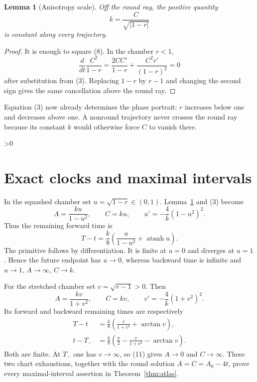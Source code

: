 \documentclass[10pt]{article}
\providecommand{\CRevisionRound}{2}
\newtheorem{lemma}{Lemma}
\theoremstyle{remark}
\begin{document}
\begin{lemma}[Anisotropy scale]\label{lem:first}
Off the round ray, the positive quantity
\begin{equation}
                 k=\frac{C}{\sqrt{|1-r|}}           \label{eq:first}
\end{equation}
is constant along every trajectory.
\end{lemma}

\begin{proof}
It is enough to square (8).  In the chamber $r<1$,
\[
 \frac{d}{dt}\frac{C^2}{1-r}
 =\frac{2CC'}{1-r}+\frac{C^2r'}{(1-r)^2}=0
\]
after substitution from (3).  Replacing $1-r$ by $r-1$ and changing the
second sign gives the same cancellation above the round ray.
\end{proof}

Equation (3) now already determines the phase portrait: $r$ increases below
one and decreases above one.  A nonround trajectory never crosses the round
ray because its constant $k$ would otherwise force $C$ to vanish there.

\ifnum\CRevisionRound>0
\section{Exact clocks and maximal intervals}

In the squashed chamber set $u=\sqrt{1-r}\in(0,1)$.  Lemma~\ref{lem:first}
and (3) become
\begin{equation}
 A=\frac{ku}{1-u^2},\qquad C=ku,
 \qquad u'=-\frac4k(1-u^2)^2.                       \label{eq:u}
\end{equation}
Thus the remaining forward time is
\begin{equation}
 T-t=\frac{k}{8}\left(\frac{u}{1-u^2}
                    +\operatorname{atanh}u\right). \label{eq:utime}
\end{equation}
The primitive follows by differentiation.  It is finite at $u=0$ and
diverges at $u=1$.  Hence the future endpoint has $u\to0$, whereas backward
time is infinite and $u\to1$, $A\to\infty$, $C\to k$.

For the stretched chamber set $v=\sqrt{r-1}>0$.  Then
\begin{equation}
 A=\frac{kv}{1+v^2},\qquad C=kv,
 \qquad v'=-\frac4k(1+v^2)^2.                       \label{eq:v}
\end{equation}
Its forward and backward remaining times are respectively
\begin{align}
 T-t&=\frac{k}{8}\left(\frac{v}{1+v^2}+\arctan v\right),
                                                               \label{eq:vfuture}\\
 t-T_-&=\frac{k}{8}\left(\frac\pi2-\frac{v}{1+v^2}
                                      -\arctan v\right).     \label{eq:vback}
\end{align}
Both are finite.  At $T_-$ one has $v\to\infty$, so (11) gives
$A\to0$ and $C\to\infty$.  These two chart exhaustions, together with the
round solution $A=C=A_0-4t$, prove every maximal-interval assertion in
Theorem~\ref{thm:atlas}.
\end{document}

